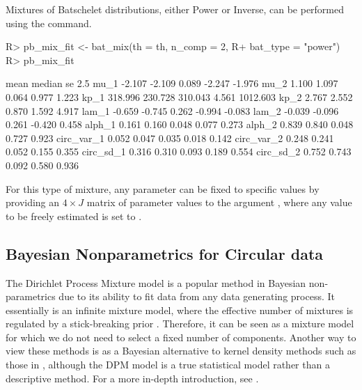 Mixtures of Batschelet distributions, either Power or Inverse, can be
performed using the  command.

\begin{CodeChunk}

\begin{CodeInput}
R> pb_mix_fit <- bat_mix(th = th, n_comp = 2, 
R+                       bat_type = "power")
R> pb_mix_fit
\end{CodeInput}

\begin{CodeOutput}
              mean  median      se   2.5%
mu_1        -2.107  -2.109   0.089 -2.247   -1.976
mu_2         1.100   1.097   0.064  0.977    1.223
kp_1       318.996 230.728 310.043  4.561 1012.603
kp_2         2.767   2.552   0.870  1.592    4.917
lam_1       -0.659  -0.745   0.262 -0.994   -0.083
lam_2       -0.039  -0.096   0.261 -0.420    0.458
alph_1       0.161   0.160   0.048  0.077    0.273
alph_2       0.839   0.840   0.048  0.727    0.923
circ_var_1   0.052   0.047   0.035  0.018    0.142
circ_var_2   0.248   0.241   0.052  0.155    0.355
circ_sd_1    0.316   0.310   0.093  0.189    0.554
circ_sd_2    0.752   0.743   0.092  0.580    0.936
\end{CodeOutput}
\end{CodeChunk}

For this type of mixture, any parameter can be fixed to specific values
by providing an \(4 \times J\) matrix of parameter values to the
argument , where any value to be freely estimated is
set to .

\hypertarget{bayesian-nonparametrics-for-circular-data}{%
\subsection{Bayesian Nonparametrics for Circular
data}\label{bayesian-nonparametrics-for-circular-data}}

\label{sec:dpmjss}

The Dirichlet Process Mixture model is a popular method in Bayesian
non-parametrics due to its ability to fit data from any data generating
process. It essentially is an infinite mixture model, where the
effective number of mixtures is regulated by a stick-breaking prior
\citep{ishwaran2001gibbs}. Therefore, it can be seen as a mixture model
for which we do not need to select a fixed number of components. Another
way to view these methods is as a Bayesian alternative to kernel density
methods such as those in  \citep{JSSv061i09}, although the
DPM model is a true statistical model rather than a descriptive method.
For a more in-depth introduction, see
\citet[ch. 23]{gelman2003bayesian}.

